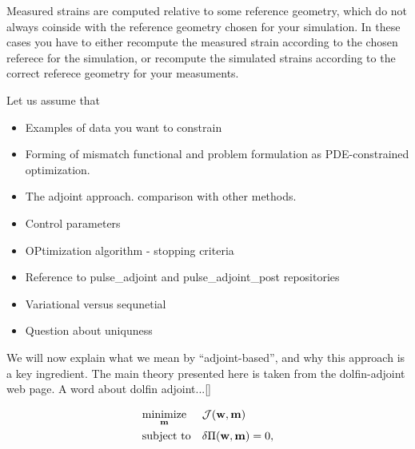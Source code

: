 \begin{remark}
  Measured strains are computed relative to some reference
  geometry, which do not always coinside with the reference geometry
  chosen for your simulation. In these cases you have to either
  recompute the measured strain according to the chosen referece for
  the simulation, or recompute the simulated strains according to the
  correct referece geometry for your measuments. 
\end{remark}




Let us assume that 


\begin{itemize}
  \item Examples of data you want to constrain
  \item Forming of mismatch functional and problem formulation as
    PDE-constrained optimization.
  \item The adjoint approach. comparison with other methods.
  \item Control parameters
  \item OPtimization algorithm - stopping criteria
  \item Reference to pulse{\_}adjoint and pulse{\_}adjoint{\_}post
    repositories
  \item Variational versus sequnetial
  \item Question about uniquness
\end{itemize}


We will now explain what we mean by ``adjoint-based'', and why this
approach is a key ingredient. The main theory presented here is taken
from the dolfin-adjoint web page. A word about dolfin adjoint...\ref{}
  
\begin{equation}
  \begin{aligned}
    \label{eq:opt_matparam}
    & \underset{\mathbf{m}}{\text{minimize}}
    & &  \mathcal{J}(\mathbf{w}, \mathbf{m}) \\
    & \text{subject to}
    & & \delta \Pi(\mathbf{w}, \mathbf{m}) = 0, 
  \end{aligned}
\end{equation}


